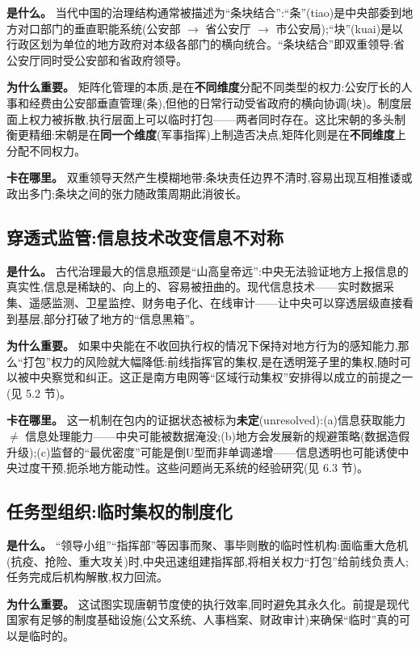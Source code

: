 \documentclass[UTF8,12pt,a4paper]{ctexrep}
\begin{document}
\textbf{是什么。} 当代中国的治理结构通常被描述为``条块结合'':``条''(tiao)是中央部委到地方对口部门的垂直职能系统(公安部 $\rightarrow$ 省公安厅 $\rightarrow$ 市公安局);``块''(kuai)是以行政区划为单位的地方政府对本级各部门的横向统合。``条块结合''即双重领导:省公安厅同时受公安部和省政府领导。

\textbf{为什么重要。} 矩阵化管理的本质,是在\textbf{不同维度}分配不同类型的权力:公安厅长的人事和经费由公安部垂直管理(条),但他的日常行动受省政府的横向协调(块)。制度层面上权力被拆散,执行层面上可以临时打包——两者同时存在。这比宋朝的多头制衡更精细:宋朝是在\textbf{同一个维度}(军事指挥)上制造否决点,矩阵化则是在\textbf{不同维度}上分配不同权力。

\textbf{卡在哪里。} 双重领导天然产生模糊地带:条块责任边界不清时,容易出现互相推诿或政出多门;条块之间的张力随政策周期此消彼长。

\subsection{穿透式监管:信息技术改变信息不对称}

\textbf{是什么。} 古代治理最大的信息瓶颈是``山高皇帝远'':中央无法验证地方上报信息的真实性,信息是稀缺的、向上的、容易被扭曲的。现代信息技术——实时数据采集、遥感监测、卫星监控、财务电子化、在线审计——让中央可以穿透层级直接看到基层,部分打破了地方的``信息黑箱''。

\textbf{为什么重要。} 如果中央能在不收回执行权的情况下保持对地方行为的感知能力,那么``打包''权力的风险就大幅降低:前线指挥官的集权,是在透明笼子里的集权,随时可以被中央察觉和纠正。这正是南方电网等``区域行动集权''安排得以成立的前提之一(见 5.2 节)。

\textbf{卡在哪里。} 这一机制在包内的证据状态被标为\textbf{未定}(unresolved):(a)信息获取能力 $\neq$ 信息处理能力——中央可能被数据淹没;(b)地方会发展新的规避策略(数据造假升级);(c)监督的``最优密度''可能是倒U型而非单调递增——信息透明也可能诱使中央过度干预,扼杀地方能动性。这些问题尚无系统的经验研究(见 6.3 节)。

\subsection{任务型组织:临时集权的制度化}

\textbf{是什么。} ``领导小组''``指挥部''等因事而聚、事毕则散的临时性机构:面临重大危机(抗疫、抢险、重大攻关)时,中央迅速组建指挥部,将相关权力``打包''给前线负责人;任务完成后机构解散,权力回流。

\textbf{为什么重要。} 这试图实现唐朝节度使的执行效率,同时避免其永久化。前提是现代国家有足够的制度基础设施(公文系统、人事档案、财政审计)来确保``临时''真的可以是临时的。
\end{document}
